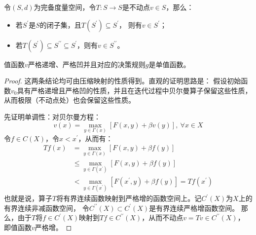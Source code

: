 \begin{lemma}
    令$(S,d)$为完备度量空间，令$T:S\rightarrow S$是不动点$v\in S$，那么：
    \begin{itemize}
        \item 若$S^{\prime}$是$S$的闭子集，且$T(S^{\prime})\subseteq S^{\prime}$，
            则有$v\in S^{\prime}$；
        \item 若$T(S^{\prime})\subseteq S^{\prime\prime} \subseteq S^{\prime}$，则有$v\in S^{\prime\prime}$。
    \end{itemize}
\end{lemma}
\begin{property}
    值函数$v$严格递增、严格凹并且对应的决策规则$g$是单值函数。
\end{property}
\begin{proof}
    这两条结论均可由压缩映射的性质得到。直观的证明思路是：
    假设初始函数$v_0$具有严格递增且严格凹的性质，并且在迭代过程中贝尔曼算子保留这些性质，从而极限（不动点处）也会保留这些性质。

    先证明单调性：对贝尔曼方程：
    \begin{equation*}
        v(x)=\max _{y \in \Gamma(x)}[F(x, y)+\beta v(y)], ~\forall x \in X
    \end{equation*}
    令$f\in C(X)$，令$x<x^{\prime}$，从而有：
    \begin{equation*}
        \begin{aligned}
            T f(x) & =\max _{y \in \Gamma(x)}[F(x, y)+\beta f(y)] \\
            & \leq \max _{y \in \Gamma\left(x^{\prime}\right)}[F(x, y)+\beta f(y)] \\
            & < \max _{y \in \Gamma\left(x^{\prime}\right)}\left[F\left(x^{\prime}, y\right) + 
                \beta f(y)\right]=T f\left(x^{\prime}\right)
        \end{aligned}
    \end{equation*}
    也就是说，算子$T$将有界连续函数映射到严格增的函数空间上。记$C^{\prime}(X)$为$X$上的有界连续非减函数空间，
    令$C^{\prime\prime}(X)\subset C^{\prime}(X)$是有界连续严格增函数空间。
    那么，由于$T$将$f\in C^{\prime}(X)$映射到$Tf\in C^{\prime\prime}(X)$，从而不动点$v=Tv\in C^{\prime\prime}(X)$，
    即值函数$v$严格增。


\end{proof}
